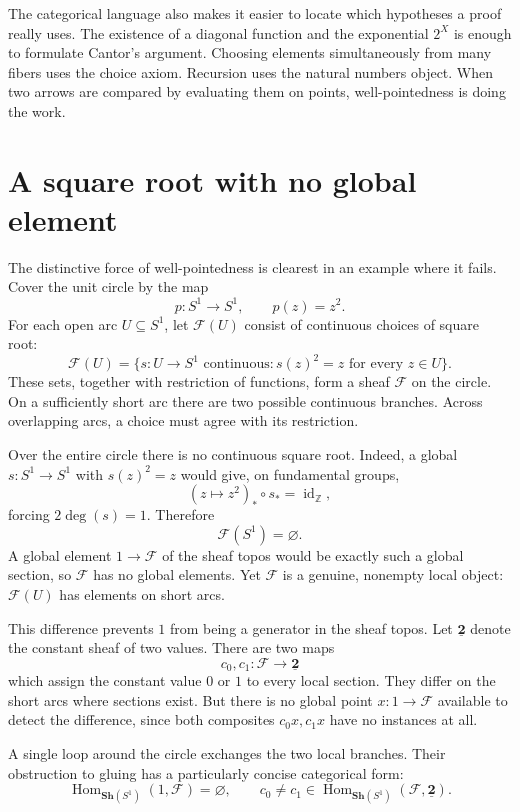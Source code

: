 The categorical language also makes it easier to locate which hypotheses a proof really uses. The existence of a diagonal function and the exponential $2^X$ is enough to formulate Cantor's argument. Choosing elements simultaneously from many fibers uses the choice axiom. Recursion uses the natural numbers object. When two arrows are compared by evaluating them on points, well-pointedness is doing the work.

\section{A square root with no global element}

The distinctive force of well-pointedness is clearest in an example where it fails. Cover the unit circle by the map
\[
 p:S^1\longrightarrow S^1,\qquad p(z)=z^2.
\]
For each open arc $U\subseteq S^1$, let $\mathcal F(U)$ consist of continuous choices of square root:
\[
 \mathcal F(U)=
 \{s:U\to S^1\text{ continuous}:s(z)^2=z
    \text{ for every }z\in U\}.
\]
These sets, together with restriction of functions, form a sheaf $\mathcal F$ on the circle. On a sufficiently short arc there are two possible continuous branches. Across overlapping arcs, a choice must agree with its restriction.

Over the entire circle there is no continuous square root. Indeed, a global $s:S^1\to S^1$ with $s(z)^2=z$ would give, on fundamental groups,
\[
 (z\mapsto z^2)_*\circ s_*
  =\operatorname{id}_{\mathbb Z},
\]
forcing $2\deg(s)=1$. Therefore
\[
 \boxed{\mathcal F(S^1)=\varnothing.}
\]
A global element $1\to\mathcal F$ of the sheaf topos would be exactly such a global section, so $\mathcal F$ has no global elements. Yet $\mathcal F$ is a genuine, nonempty local object: $\mathcal F(U)$ has elements on short arcs.

This difference prevents $1$ from being a generator in the sheaf topos. Let $\underline{\mathbf2}$ denote the constant sheaf of two values. There are two maps
\[
 c_0,c_1:\mathcal F\longrightarrow\underline{\mathbf2}
\]
which assign the constant value $0$ or $1$ to every local section. They differ on the short arcs where sections exist. But there is no global point $x:1\to\mathcal F$ available to detect the difference, since both composites $c_0x,c_1x$ have no instances at all.

A single loop around the circle exchanges the two local branches. Their obstruction to gluing has a particularly concise categorical form:
\[
 \boxed{\operatorname{Hom}_{\mathbf{Sh}(S^1)}(1,\mathcal F)=\varnothing,
 \qquad
 c_0\ne c_1\in
 \operatorname{Hom}_{\mathbf{Sh}(S^1)}
        (\mathcal F,\underline{\mathbf2}).}
\]
